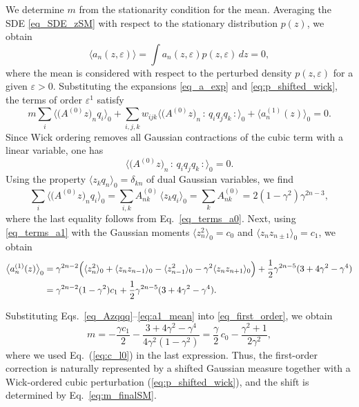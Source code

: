 \documentclass[aps,twocolumn,superscriptaddress]{revtex4-2}
\begin{document}
We determine \(m\) from the stationarity condition for the mean. Averaging the SDE \eqref{eq_SDE_zSM} with respect to the stationary distribution \(p(z)\), we obtain
\begin{equation}
\langle a_n(z,\varepsilon)\rangle
= \int a_n(z,\varepsilon)p(z,\varepsilon)\, dz
= 0,
\label{eq_mean_order}
\end{equation}
where the mean is considered with respect to the perturbed density $p(z,\varepsilon)$ for a given $\varepsilon > 0$.
Substituting the expansions \eqref{eq_a_exp} and \eqref{eq:p_shifted_wick}, the terms of order $\varepsilon^1$ satisfy
\begin{equation}
m \sum_i \Big\langle \big(A^{(0)}z\big)_n q_i \Big\rangle_0
+ \sum_{i,j,k} w_{ijk} \Big\langle \big(A^{(0)}z\big)_n \,{:}\, q_i q_j q_k \,{:} \Big\rangle_0
+ \big\langle a_n^{(1)}(z)\big\rangle_0 = 0.
\label{eq_first_order}
\end{equation}
Since Wick ordering removes all Gaussian contractions of the cubic term with a linear variable, one has
\begin{equation}
\Big\langle \big(A^{(0)}z\big)_n \,{:}\, q_i q_j q_k \,{:} \Big\rangle_0 = 0.
\label{eq_Azqqq}
\end{equation}
Using the property $\big\langle z_k q_n \big\rangle_0 = \delta_{kn}$ of dual Gaussian variables, we find
\begin{equation}
\sum_i \Big\langle \big(A^{(0)}z\big)_n q_i \Big\rangle_0
=
\sum_{i,k} A^{(0)}_{nk}\,\langle z_k q_i\rangle_0
= \sum_k A^{(0)}_{nk} = 2(1-\gamma^2)\gamma^{2n-3},
\end{equation}
where the last equality follows from Eq.~\eqref{eq_terms_a0}.
Next, using \eqref{eq_terms_a1} with the Gaussian moments \(\langle z_n^2\rangle_0=c_0\) and
\(\langle z_n z_{n\pm1}\rangle_0=c_1\), we obtain
\begin{align}
\big\langle a_n^{(1)}(z)\big\rangle_0
&=
\gamma^{2n-2}\Bigl(
\langle z_n^2\rangle_0+\langle z_n z_{n-1}\rangle_0
-\langle z_{n-1}^2\rangle_0
-\gamma^2\langle z_n z_{n+1}\rangle_0
\Bigr)
+\frac12\gamma^{2n-5}(3+4\gamma^2-\gamma^4)
\nonumber\\
&=
\gamma^{2n-2}(1-\gamma^2)c_1
+\frac12\gamma^{2n-5}(3+4\gamma^2-\gamma^4).
\label{eq:a1_mean}
\end{align}

Substituting Eqs.~\eqref{eq_Azqqq}--\eqref{eq:a1_mean} into \eqref{eq_first_order}, we obtain
\begin{equation}
m
=
-\frac{\gamma c_1}{2}
-\frac{3+4\gamma^2-\gamma^4}{4\gamma^2(1-\gamma^2)}
= \frac{\gamma}{2}\,c_0-\frac{\gamma^2+1}{2\gamma^2},
\label{eq:m_finalSM}
\end{equation}
where we used Eq.~(\ref{eq:c_l0}) in the last expression.
Thus, the first-order correction is naturally represented by a shifted Gaussian measure together with a Wick-ordered cubic perturbation (\ref{eq:p_shifted_wick}), and the shift is determined by Eq.~\eqref{eq:m_finalSM}.
\end{document}

